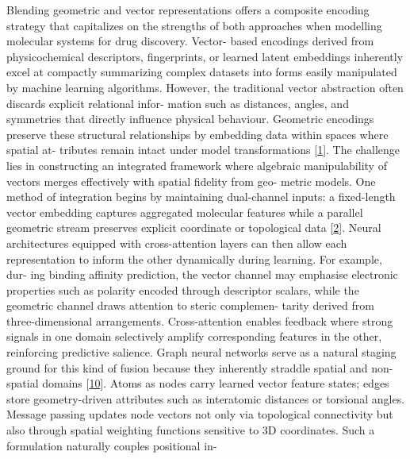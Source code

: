 \documentclass[
]{article}
\begin{document}
Blending geometric and vector representations offers a composite
encoding strategy that capitalizes on the strengths of both approaches
when modelling molecular systems for drug discovery. Vector- based
encodings derived from physicochemical descriptors, fingerprints, or
learned latent embeddings inherently excel at compactly summarizing
complex datasets into forms easily manipulated by machine learning
algorithms. However, the traditional vector abstraction often discards
explicit relational infor- mation such as distances, angles, and
symmetries that directly influence physical behaviour. Geometric
encodings preserve these structural relationships by embedding data
within spaces where spatial at- tributes remain intact under model
transformations {[}\protect\hyperlink{_bookmark41}{1}{]}. The challenge
lies in constructing an integrated framework where algebraic
manipulability of vectors merges effectively with spatial fidelity from
geo- metric models. One method of integration begins by maintaining
dual-channel inputs: a fixed-length vector embedding captures aggregated
molecular features while a parallel geometric stream preserves explicit
coordinate or topological data {[}\protect\hyperlink{_bookmark42}{2}{]}.
Neural architectures equipped with cross-attention layers can then allow
each representation to inform the other dynamically during learning. For
example, dur- ing binding affinity prediction, the vector channel may
emphasise electronic properties such as polarity encoded through
descriptor scalars, while the geometric channel draws attention to
steric complemen- tarity derived from three-dimensional arrangements.
Cross-attention enables feedback where strong signals in one domain
selectively amplify corresponding features in the other, reinforcing
predictive salience. Graph neural networks serve as a natural staging
ground for this kind of fusion because they inherently straddle spatial
and non-spatial domains {[}\protect\hyperlink{_bookmark50}{10}{]}. Atoms
as nodes carry learned vector feature states; edges store
geometry-driven attributes such as interatomic distances or torsional
angles. Message passing updates node vectors not only via topological
connectivity but also through spatial weighting functions sensitive to
3D coordinates. Such a formulation naturally couples positional in-
\end{document}
